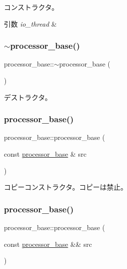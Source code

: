 コンストラクタ。 
\begin{DoxyParams}{引数}
{\em io\+\_\+thread} & \\
\hline
\end{DoxyParams}
\hypertarget{classprocessor__base_a158d2b8a7cbfaff3b56de60c9ca00de2}{}\label{classprocessor__base_a158d2b8a7cbfaff3b56de60c9ca00de2} 
\subsubsection{\texorpdfstring{$\sim$processor\+\_\+base()}{~processor\_base()}}
{\footnotesize\ttfamily processor\+\_\+base\+::$\sim$processor\+\_\+base (\begin{DoxyParamCaption}{ }\end{DoxyParamCaption})\hspace{0.3cm}{\ttfamily [virtual]}}

デストラクタ。 \hypertarget{classprocessor__base_aef9b4dfa6c564ad86d5b28210772be33}{}\label{classprocessor__base_aef9b4dfa6c564ad86d5b28210772be33} 
\subsubsection{\texorpdfstring{processor\+\_\+base()}{processor\_base()}\hspace{0.1cm}{\footnotesize\ttfamily [2/3]}}
{\footnotesize\ttfamily processor\+\_\+base\+::processor\+\_\+base (\begin{DoxyParamCaption}\item[{const \hyperlink{classprocessor__base}{processor\+\_\+base} \&}]{src }\end{DoxyParamCaption})\hspace{0.3cm}{\ttfamily [delete]}}

コピーコンストラクタ。コピーは禁止。 \hypertarget{classprocessor__base_a5d8c9251cdf1e4d522f16a0b605c7d6a}{}\label{classprocessor__base_a5d8c9251cdf1e4d522f16a0b605c7d6a} 
\subsubsection{\texorpdfstring{processor\+\_\+base()}{processor\_base()}\hspace{0.1cm}{\footnotesize\ttfamily [3/3]}}
{\footnotesize\ttfamily processor\+\_\+base\+::processor\+\_\+base (\begin{DoxyParamCaption}\item[{const \hyperlink{classprocessor__base}{processor\+\_\+base} \&\&}]{src }\end{DoxyParamCaption})\hspace{0.3cm}{\ttfamily [delete]}}

